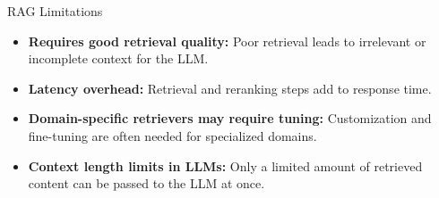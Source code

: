 \begin{frame}{RAG Limitations}
    \begin{itemize}
        \setlength{\itemsep}{1em}
        \item \textbf{Requires good retrieval quality:} Poor retrieval leads to irrelevant or incomplete context for the LLM.
        \item \textbf{Latency overhead:} Retrieval and reranking steps add to response time.
        \item \textbf{Domain-specific retrievers may require tuning:} Customization and fine-tuning are often needed for specialized domains.
        \item \textbf{Context length limits in LLMs:} Only a limited amount of retrieved content can be passed to the LLM at once.
    \end{itemize}
\end{frame}
